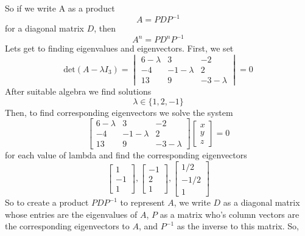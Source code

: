 \documentclass{article}
\begin{document}
So if we write A as a product
\begin{equation*}
    A=PDP^{-1}
\end{equation*} 
for a diagonal matrix $D$, then
\begin{equation*}
    A^n=PD^nP^{-1}
\end{equation*}
Lets get to finding eigenvalues and eigenvectors. First, we set
\begin{equation*}
    \text{det}{(A-\lambda I_3)}=\begin{vmatrix}
6-\lambda & 3 & -2\\
-4 & -1-\lambda & 2 \\
13 & 9 & -3-\lambda
\end{vmatrix}=0
\end{equation*} After suitable algebra we find solutions
\begin{equation*}
    \lambda \in \{1,2,-1\}
\end{equation*}
Then, to find corresponding eigenvectors we solve the system
\begin{equation*}
    \begin{bmatrix}
6-\lambda & 3 & -2\\
-4 & -1-\lambda & 2 \\
13 & 9 & -3-\lambda
\end{bmatrix}\begin{bmatrix}
x \\
y \\
z
\end{bmatrix}=0
\end{equation*} for each value of lambda and find the corresponding eigenvectors \newpage
\begin{equation*}
    \begin{bmatrix}
1 \\
-1 \\
1
\end{bmatrix},\begin{bmatrix}
-1 \\
2 \\
1
\end{bmatrix},\begin{bmatrix}
1/2 \\
-1/2 \\
1
\end{bmatrix}
\end{equation*}
So to create a product $PDP^{-1}$ to represent $A$, we write $D$ as a diagonal matrix whose entries are the eigenvalues of $A$, $P$ as a matrix who's column vectors are the corresponding eigenvectors to $A$, and $P^{-1}$ as the inverse to this matrix. So,
\end{document}
